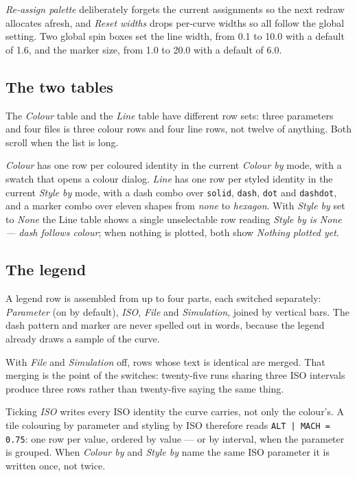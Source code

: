 \documentclass[11pt,a4paper,oneside]{report}
\newcommand{\code}[1]{\texttt{#1}}
\begin{document}
\emph{Re-assign palette} deliberately forgets the current assignments so the next
redraw allocates afresh, and \emph{Reset widths} drops per-curve widths so all
follow the global setting. Two global spin boxes set the line width, from 0.1 to
10.0 with a default of 1.6, and the marker size, from 1.0 to 20.0 with a default
of 6.0.

\subsection{The two tables}

The \emph{Colour} table and the \emph{Line} table have different row sets:
three parameters and four files is three colour rows and four line rows, not
twelve of anything. Both scroll when the list is long.

\emph{Colour} has one row per coloured identity in the current \emph{Colour by}
mode, with a swatch that opens a colour dialog. \emph{Line} has one row per
styled identity in the current \emph{Style by} mode, with a dash combo over
\code{solid}, \code{dash}, \code{dot} and \code{dashdot}, and a marker combo over
eleven shapes from \emph{none} to \emph{hexagon}. With \emph{Style by} set to
\emph{None} the Line table shows a single unselectable row reading \emph{Style by
is None --- dash follows colour}; when nothing is plotted, both show
\emph{Nothing plotted yet}.

\subsection{The legend}
\label{sec:legend}

A legend row is assembled from up to four parts, each switched separately:
\emph{Parameter} (on by default), \emph{ISO}, \emph{File} and \emph{Simulation},
joined by vertical bars. The dash pattern and marker are never spelled out in
words, because the legend already draws a sample of the curve.

With \emph{File} and \emph{Simulation} off, rows whose text is identical are
merged. That merging is the point of the switches: twenty-five runs sharing three
ISO intervals produce three rows rather than twenty-five saying the same thing.

Ticking \emph{ISO} writes every ISO identity the curve carries, not only the
colour's. A tile colouring by parameter and styling by ISO therefore reads
\code{ALT | MACH = 0.75}: one row per value, ordered by value --- or by
interval, when the parameter is grouped. When \emph{Colour by} and \emph{Style
by} name the same ISO parameter it is written once, not twice.
\end{document}
